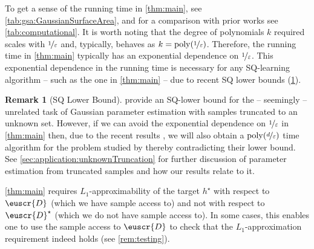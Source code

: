 \documentclass[11pt]{article}
\theoremstyle{plain}
\theoremstyle{definition}
\newtheorem{remark}[theorem]{Remark}
\theoremstyle{remark}
\newcommand{\nfrac}[2]{\nicefrac{#1}{#2}}
\newcommand{\poly}{\mathrm{poly}}
\newcommand{\eps}{\varepsilon}
\newcommand{\customcal}[1]{\euscr{#1}}
\newcommand{\cD}{\customcal{D}}
\newcommand{\cDtrue}{\cD^\star}
\newcommand{\cDgiven}{\cD}
\newcommand{\nL}{L}
\begin{document}
        To get a sense of the running time in \cref{thm:main}, see \cref{tab:gsa:GaussianSurfaceArea}, and for a comparison with prior works see \cref{tab:computational}.
        It is worth noting that the degree of polynomials $k$ required scales with $\nfrac{1}{\eps}$ and, typically, behaves as $k=\poly(\nfrac{1}{\eps})$.
        Therefore, the running time in \cref{thm:main} typically has an exponential dependence on $\nfrac{1}{\eps}$.
        This exponential dependence in the running time is necessary for any SQ-learning algorithm -- such as the one in \cref{thm:main} -- due to recent SQ lower bounds \cite{diakonikolas2024statistical} (\cref{rem:SQlowerbound}).
        \begin{remark}[SQ Lower Bound]\label{rem:SQlowerbound}
            \citet{diakonikolas2024statistical} provide an SQ-lower bound for the -- seemingly -- unrelated task of Gaussian parameter estimation with samples truncated to an unknown set.
            However, if we can avoid the exponential dependence on $\nfrac{1}{\eps}$ in \cref{thm:main} then, due to the recent results \cite{lee2024unknown}, we will also obtain a $\poly(\nfrac{d}{\eps})$ time algorithm for the problem studied by \citet{diakonikolas2024statistical} thereby contradicting their lower bound.
            See \cref{sec:application:unknownTruncation} for further discussion of parameter estimation from truncated samples and how our results relate to it.
        \end{remark}
        \cref{thm:main} requires $\nL_1$-approximability of the target $h^\star$ with respect to $\cDgiven$ (which we have sample access to) and not with respect to $\cDtrue$ (which we do not have sample access to).
        In some cases, this enables one to use the sample access to $\cDgiven$ to check that the $\nL_1$-approximation requirement indeed holds (see \cref{rem:testing}).
    
\end{document}
